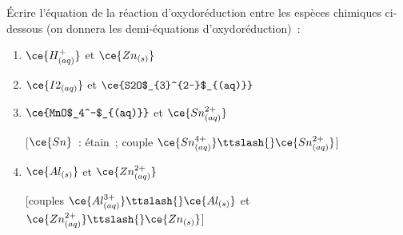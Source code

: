 Écrire l'équation de la réaction d'oxydoréduction entre les espèces chimiques
ci-dessous (on donnera les demi-équations d'oxydoréduction)~:
\begin{enumerate}
    \item $\ce{H^{+}_{(aq)}}$ et $\ce{Zn_{(s)}}$ 
    \item $\ce{I2_{(aq)}}$ et $\ce{S2O$_{3}^{2-}$_{(aq)}}$
    \item $\ce{MnO$_4^-$_{(aq)}}$ et $\ce{Sn^{2+}_{(aq)}}$

          [$\ce{Sn}$~: étain~; couple
          $\ce{Sn^{4+}_{(aq)}}\ttslash{}\ce{Sn^{2+}_{(aq)}}$]
    \item $\ce{Al_{(s)}}$ et $\ce{Zn^{2+}_{(aq)}}$

          [couples $\ce{Al^{3+}_{(aq)}}\ttslash{}\ce{Al_{(s)}}$ et
          $\ce{Zn^{2+}_{(aq)}}\ttslash{}\ce{Zn_{(s)}}$]
\end{enumerate}

